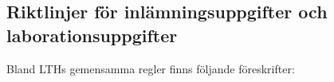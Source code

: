 \documentclass[fleqn, article, a4paper]{memoir}
\begin{document}



\newpage
\subsection*{Riktlinjer för inlämningsuppgifter och laborationsuppgifter}
Bland LTHs gemensamma regler finns följande föreskrifter:
\end{document}

